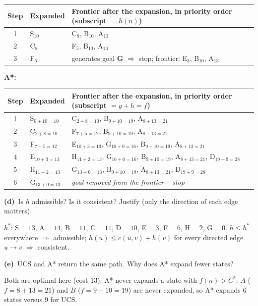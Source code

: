 \documentclass[11pt,a4paper]{article}
\newcommand{\subq}[1]{\par\smallskip\noindent\textbf{#1}\ }
\begin{document}
\begin{solbox}
\begin{center}
\begin{tabularx}{\linewidth}{c l >{\raggedright\arraybackslash}X}
Step & Expanded & Frontier after the expansion, in priority order (subscript $=h(n)$) \\ \midrule
1 & S$_{10}$ & C$_{8}$, B$_{10}$, A$_{13}$ \\
2 & C$_{8}$ & F$_{5}$, B$_{10}$, A$_{13}$ \\
3 & F$_{5}$ & generates goal \textbf{G} $\Rightarrow$ stop; frontier: E$_{3}$, B$_{10}$, A$_{13}$ \\
\bottomrule\end{tabularx}\end{center}\textbf{A*:}\begin{center}\small\begin{tabularx}{\linewidth}{c l >{\raggedright\arraybackslash}X}\toprule
Step & Expanded & Frontier after the expansion, in priority order (subscript $=g+h=f$) \\ \midrule
1 & S$_{0+10=10}$ & C$_{2+8=10}$, B$_{9+10=19}$, A$_{8+13=21}$ \\
2 & C$_{2+8=10}$ & F$_{7+5=12}$, B$_{9+10=19}$, A$_{8+13=21}$ \\
3 & F$_{7+5=12}$ & E$_{10+3=13}$, G$_{16+0=16}$, B$_{9+10=19}$, A$_{8+13=21}$ \\
4 & E$_{10+3=13}$ & H$_{11+2=13}$, G$_{16+0=16}$, B$_{9+10=19}$, A$_{8+13=21}$, D$_{19+9=28}$ \\
5 & H$_{11+2=13}$ & G$_{13+0=13}$, B$_{9+10=19}$, A$_{8+13=21}$, D$_{19+9=28}$ \\
6 & G$_{13+0=13}$ & \textit{goal removed from the frontier -- stop} \\
\bottomrule\end{tabularx}\end{center}
\end{solbox}
\subq{(d)}Is $h$ admissible? Is it consistent? Justify (only the direction of each edge matters).
\begin{solbox}
$h^*$: S$=13$, A$=14$, B$=11$, C$=11$, D$=10$, E$=3$, F$=6$, H$=2$, G$=0$. $h\le h^*$ everywhere $\Rightarrow$ admissible; $h(u)\le c(u,v)+h(v)$ for every directed edge $u\to v$ $\Rightarrow$ consistent.
\end{solbox}
\subq{(e)}UCS and A* return the same path. Why does A* expand fewer states?
\begin{solbox}
Both are optimal here (cost 13). A* never expands a state with $f(n)>C^*$: $A$ ($f=8+13=21$) and $B$ ($f=9+10=19$) are never expanded, so A* expands 6 states versus 9 for UCS.
\end{solbox}
\end{document}
